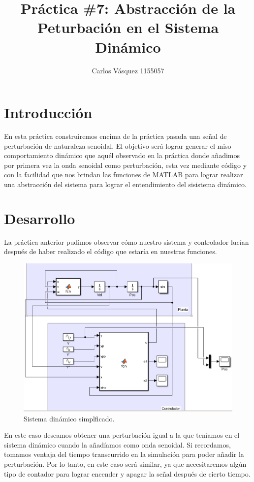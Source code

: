 \documentclass[12pt, letterpaper]{article}
\title{Práctica \#7: Abstracción de la Peturbación en el Sistema Dinámico}
\author{Carlos Vásquez 1155057}
\begin{document}
\maketitle
\section*{Introducción}

En esta práctica construiremos encima de la práctica pasada una señal de perturbación de naturaleza senoidal. El objetivo será lograr generar el miso comportamiento dinámico que aquél observado en la práctica donde añadimos por primera vez la onda senoidal como perturbación, esta vez mediante código y con la facilidad que nos brindan las funciones de MATLAB para lograr realizar una abstracción del sistema para lograr el entendimiento del sisistema dinámico.

\section*{Desarrollo}

La práctica anterior pudimos observar cómo nuestro sistema y controlador lucían después de haber realizado el código que estaría en nuestras funciones.

\begin{figure}[H]
	\centering
	\includegraphics[width=\textwidth]{sysold.png}
	\caption{Sistema dinámico simplficado.}
\end{figure}

En este caso deseamos obtener una perturbación igual a la que teníamos en el sistema dinámico cuando la añadíamos como onda senoidal. Si recordamos, tomamos ventaja del tiempo transcurrido en la simulación para poder añadir la perturbación. Por lo tanto, en este caso será similar, ya que necesitaremos algún tipo de contador para lograr encender y apagar la señal después de cierto tiempo. 
\end{document}
